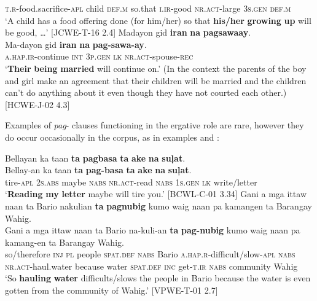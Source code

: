 \textsc{t.r}-food.sacrifice-\textsc{apl}  child  \textsc{def.m}  so.that  \textsc{i.ir}-good  \textsc{nr.act}-large  3\textsc{s.gen}  \textsc{def.m} \\
\glt ‘A child has a food offering done (for him/her) so that \textbf{his/her} \textbf{growing} \textbf{up} will be good, …’ [JCWE-T-16 2.4]
\z
\ea
\label{bkm:Ref114812177}
Madayon  gid  \textbf{iran}  \textbf{na}  \textbf{pagsawaay}. \smallskip\\
\gll Ma-dayon  gid  \textbf{iran}  \textbf{na}  \textbf{pag-sawa-ay}. \\
\textsc{a.hap.ir}-continue  \textsc{int}  3\textsc{p.gen}  \textsc{lk}  \textsc{nr.act}-spouse-\textsc{rec} \\
\glt ‘\textbf{Their} \textbf{being} \textbf{married} will continue on.’ (In the context the parents of the boy and girl make an agreement that their children will be married and the children can’t do anything about it even though they have not courted each other.) [HCWE-J-02 4.3]
\z

Examples of \textit{pag}{}- clauses functioning in the ergative role are rare, however they do occur occasionally in the corpus, as in examples  and :

\ea
\label{bkm:Ref114812284}
Bellayan  ka  taan  \textbf{ta}  \textbf{pagbasa}  \textbf{ta}  \textbf{ake}  \textbf{na}  \textbf{suļat}. \smallskip\\
\gll Bellay-an  ka  taan  \textbf{ta}  \textbf{pag-basa}  \textbf{ta}  \textbf{ake}  \textbf{na}  \textbf{suļat}. \\
tire-\textsc{apl}  2\textsc{s.abs}  maybe  \textsc{nabs}  \textsc{nr.act}-read  \textsc{nabs}  1\textsc{s.gen} \textsc{lk}  write/letter \\
\glt ‘\textbf{Reading} \textbf{my} \textbf{letter} maybe will tire you.’ [BCWL-C-01 3.34]
\z
\ea
\label{bkm:Ref114812335}
Gani  a  mga  ittaw  naan  ta  Bario  nakulian \textbf{ta}  \textbf{pagnubig}  kumo  waig  naan  pa  kamangen ta  Barangay  Wahig. \smallskip\\
\gll Gani  a  mga  ittaw  naan  ta  Bario  na-kuli-an \textbf{ta}  \textbf{pag-nubig}  kumo  waig  naan  pa  kamang-en ta  Barangay  Wahig. \\
so/therefore  \textsc{inj}  \textsc{pl}  people  \textsc{spat.def}  \textsc{nabs}  Bario  \textsc{a.hap.r}-difficult/slow-\textsc{apl}
\textsc{nabs}  \textsc{nr.act-}haul.water  because  water  \textsc{spat.def}  \textsc{inc}  get-\textsc{t.ir} \textsc{nabs}  community  Wahig \\
\glt `So \textbf{hauling} \textbf{water} difficults/slows the people in Bario because the water is even gotten from the community of Wahig.’ [VPWE-T-01 2.7]
\z

